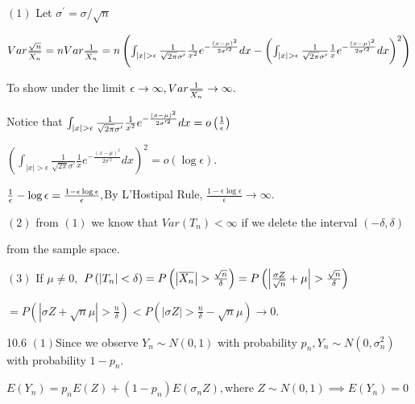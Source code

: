 \documentclass{article}
\begin{document}
$\left( 1\right) $ Let $\sigma ^{\prime }=\sigma /\sqrt{n}$

$Var\frac{\sqrt{n}}{\overline{X_{n}}}=nVar\frac{1}{\overline{X_{n}}}=n\left(
\int_{\left\vert x\right\vert >\epsilon }\frac{1}{\sqrt{2\pi }\sigma
^{\prime }}\frac{1}{x^{2}}e^{-\frac{\left( x-\mu \right) ^{2}}{2\sigma
^{\prime 2}}}dx-\left( \int_{\left\vert x\right\vert >\epsilon }\frac{1}{%
\sqrt{2\pi }\sigma ^{\prime }}\frac{1}{x}e^{-\frac{\left( x-\mu \right) ^{2}%
}{2\sigma ^{\prime 2}}}dx\right) ^{2}\right) $

To show under the limit $\epsilon \rightarrow \infty ,Var\frac{1}{\overline{%
X_{n}}}\rightarrow \infty .$

Notice that $\int_{\left\vert x\right\vert >\epsilon }\frac{1}{\sqrt{2\pi }%
\sigma ^{\prime }}\frac{1}{x^{2}}e^{-\frac{\left( x-\mu \right) ^{2}}{%
2\sigma ^{\prime 2}}}dx=o\left( \frac{1}{\epsilon }\right) $

$\left( \int_{\left\vert x\right\vert >\epsilon }\frac{1}{\sqrt{2\pi }\sigma
^{\prime }}\frac{1}{x}e^{-\frac{\left( x-\mu \right) ^{2}}{2\sigma ^{\prime
2}}}dx\right) ^{2}=o\left( \log \epsilon \right) .$

$\frac{1}{\epsilon }-\log \epsilon =\frac{1-\epsilon \log \epsilon }{%
\epsilon },$By L'Hostipal Rule, $\frac{1-\epsilon \log \epsilon }{\epsilon }%
\rightarrow \infty .$

$\left( 2\right) $ from $\left( 1\right) $ we know that $Var\left(
T_{n}\right) <\infty $ if we delete the interval $\left( -\delta ,\delta
\right) $ 

\bigskip from the sample space. 

$\left( 3\right) $ If $\mu \neq 0,$ $P\left( \left\vert T_{n}\right\vert
<\delta \right) =P\left( \left\vert \overline{X_{n}}\right\vert >\frac{\sqrt{%
n}}{\delta }\right) =P\left( \left\vert \frac{\sigma Z}{\sqrt{n}}+\mu
\right\vert >\frac{\sqrt{n}}{\delta }\right) $

$=P\left( \left\vert \sigma Z+\sqrt{n}\mu \right\vert >\frac{n}{\delta }%
\right) <P\left( \left\vert \sigma Z\right\vert >\frac{n}{\delta }-\sqrt{n}%
\mu \right) \rightarrow 0.$

10.6 $\left( 1\right) $Since we observe $Y_{n}\sim N\left( 0,1\right) 
$ with probability $p_{n},Y_{n}\sim N\left( 0,\sigma _{n}^{2}\right) $
with probability $1-p_{n}.$

$E\left( Y_{n}\right) =p_{n}E\left( Z\right) +\left( 1-p_{n}\right) E\left(
\sigma _{n}Z\right) ,$where $Z\sim N\left( 0,1\right) \implies
E\left( Y_{n}\right) =0$
\end{document}
